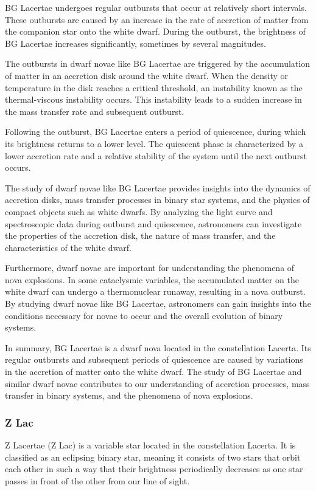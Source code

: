 BG Lacertae undergoes regular outbursts that occur at relatively short intervals. These outbursts are caused by an increase in the rate of accretion of matter from the companion star onto the white dwarf. During the outburst, the brightness of BG Lacertae increases significantly, sometimes by several magnitudes.

The outbursts in dwarf novae like BG Lacertae are triggered by the accumulation of matter in an accretion disk around the white dwarf. When the density or temperature in the disk reaches a critical threshold, an instability known as the thermal-viscous instability occurs. This instability leads to a sudden increase in the mass transfer rate and subsequent outburst.

Following the outburst, BG Lacertae enters a period of quiescence, during which its brightness returns to a lower level. The quiescent phase is characterized by a lower accretion rate and a relative stability of the system until the next outburst occurs.

The study of dwarf novae like BG Lacertae provides insights into the dynamics of accretion disks, mass transfer processes in binary star systems, and the physics of compact objects such as white dwarfs. By analyzing the light curve and spectroscopic data during outburst and quiescence, astronomers can investigate the properties of the accretion disk, the nature of mass transfer, and the characteristics of the white dwarf.

Furthermore, dwarf novae are important for understanding the phenomena of nova explosions. In some cataclysmic variables, the accumulated matter on the white dwarf can undergo a thermonuclear runaway, resulting in a nova outburst. By studying dwarf novae like BG Lacertae, astronomers can gain insights into the conditions necessary for novae to occur and the overall evolution of binary systems.

In summary, BG Lacertae is a dwarf nova located in the constellation Lacerta. Its regular outbursts and subsequent periods of quiescence are caused by variations in the accretion of matter onto the white dwarf. The study of BG Lacertae and similar dwarf novae contributes to our understanding of accretion processes, mass transfer in binary systems, and the phenomena of nova explosions.

\subsubsection*{ Z Lac }
Z Lacertae (Z Lac) is a variable star located in the constellation Lacerta. It is classified as an eclipsing binary star, meaning it consists of two stars that orbit each other in such a way that their brightness periodically decreases as one star passes in front of the other from our line of sight.

